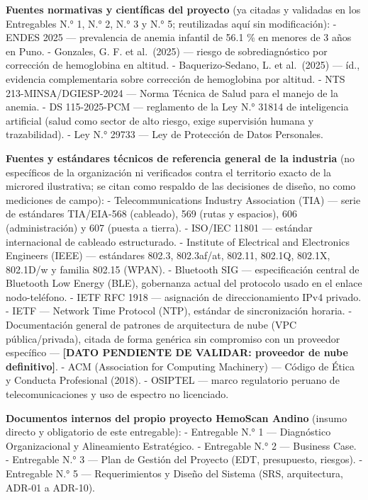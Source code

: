 \documentclass[11pt,a4paper]{article}
\begin{document}
\textbf{Fuentes normativas y científicas del proyecto} (ya citadas y validadas en los Entregables N.° 1, N.° 2, N.° 3 y N.° 5; reutilizadas aquí sin modificación):
- ENDES 2025 --- prevalencia de anemia infantil de 56.1 \% en menores de 3 años en Puno.
- Gonzales, G. F. et al.~(2025) --- riesgo de sobrediagnóstico por corrección de hemoglobina en altitud.
- Baquerizo-Sedano, L. et al.~(2025) --- íd., evidencia complementaria sobre corrección de hemoglobina por altitud.
- NTS 213-MINSA/DGIESP-2024 --- Norma Técnica de Salud para el manejo de la anemia.
- DS 115-2025-PCM --- reglamento de la Ley N.° 31814 de inteligencia artificial (salud como sector de alto riesgo, exige supervisión humana y trazabilidad).
- Ley N.° 29733 --- Ley de Protección de Datos Personales.

\textbf{Fuentes y estándares técnicos de referencia general de la industria} (no específicos de la organización ni verificados contra el territorio exacto de la microred ilustrativa; se citan como respaldo de las decisiones de diseño, no como mediciones de campo):
- Telecommunications Industry Association (TIA) --- serie de estándares TIA/EIA-568 (cableado), 569 (rutas y espacios), 606 (administración) y 607 (puesta a tierra).
- ISO/IEC 11801 --- estándar internacional de cableado estructurado.
- Institute of Electrical and Electronics Engineers (IEEE) --- estándares 802.3, 802.3af/at, 802.11, 802.1Q, 802.1X, 802.1D/w y familia 802.15 (WPAN).
- Bluetooth SIG --- especificación central de Bluetooth Low Energy (BLE), gobernanza actual del protocolo usado en el enlace nodo-teléfono.
- IETF RFC 1918 --- asignación de direccionamiento IPv4 privado.
- IETF --- Network Time Protocol (NTP), estándar de sincronización horaria.
- Documentación general de patrones de arquitectura de nube (VPC pública/privada), citada de forma genérica sin compromiso con un proveedor específico --- \textbf{{[}DATO PENDIENTE DE VALIDAR: proveedor de nube definitivo{]}}.
- ACM (Association for Computing Machinery) --- Código de Ética y Conducta Profesional (2018).
- OSIPTEL --- marco regulatorio peruano de telecomunicaciones y uso de espectro no licenciado.

\textbf{Documentos internos del propio proyecto HemoScan Andino} (insumo directo y obligatorio de este entregable):
- Entregable N.° 1 --- Diagnóstico Organizacional y Alineamiento Estratégico.
- Entregable N.° 2 --- Business Case.
- Entregable N.° 3 --- Plan de Gestión del Proyecto (EDT, presupuesto, riesgos).
- Entregable N.° 5 --- Requerimientos y Diseño del Sistema (SRS, arquitectura, ADR-01 a ADR-10).
\end{document}
